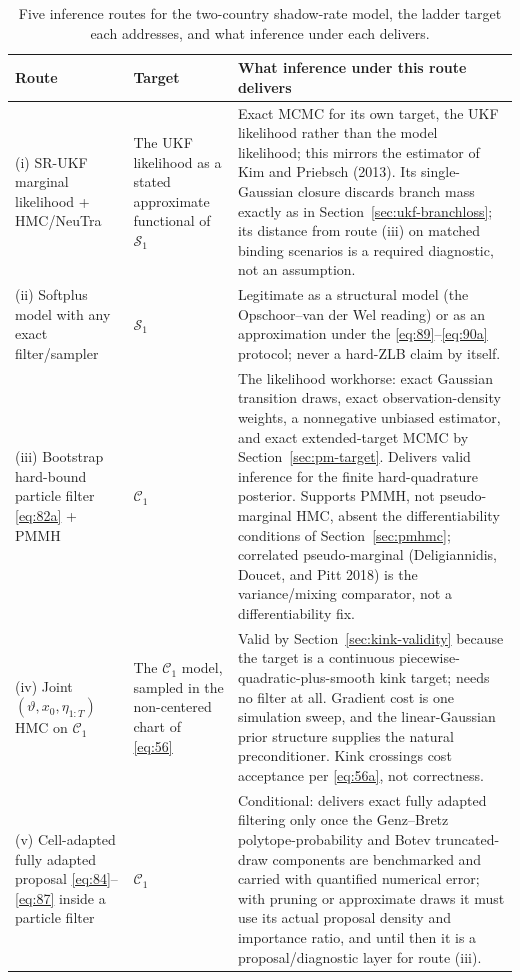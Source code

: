 \documentclass[11pt]{article}
\begin{document}
\begin{table}[htbp]\small
\begin{tabularx}{\textwidth}{@{}>{\raggedright\arraybackslash}p{}XX@{}}
\toprule
Route & Target & What inference under this route delivers \\
\midrule
(i) SR-UKF marginal likelihood + HMC/NeuTra &
The UKF likelihood as a stated approximate functional of
\(\mathcal S_1\) &
Exact MCMC for its own target, the UKF likelihood rather than the model
likelihood; this mirrors the estimator of Kim and Priebsch (2013). Its
single-Gaussian closure discards branch mass exactly as in
Section~\ref{sec:ukf-branchloss}; its distance from route (iii) on matched
binding scenarios is a required diagnostic, not an assumption. \\
(ii) Softplus model with any exact filter/sampler &
\(\mathcal S_1\) &
Legitimate as a structural model (the Opschoor--van der Wel reading)
or as an approximation under the \eqref{eq:89}--\eqref{eq:90a}
protocol; never a hard-ZLB claim by itself. \\
(iii) Bootstrap hard-bound particle filter \eqref{eq:82a} + PMMH &
\(\mathcal C_1\) &
The likelihood workhorse: exact Gaussian transition draws, exact
observation-density weights, a nonnegative unbiased estimator, and
exact extended-target MCMC by Section~\ref{sec:pm-target}. Delivers valid
inference for the finite hard-quadrature posterior. Supports PMMH, not
pseudo-marginal HMC, absent the differentiability conditions of
Section~\ref{sec:pmhmc}; correlated pseudo-marginal (Deligiannidis, Doucet,
and Pitt 2018) is the variance/mixing comparator, not a
differentiability fix. \\
(iv) Joint \((\vartheta,x_0,\eta_{1:T})\) HMC on \(\mathcal C_1\) &
The \(\mathcal C_1\) model, sampled in the non-centered chart of
\eqref{eq:56} &
Valid by Section~\ref{sec:kink-validity} because the target is a continuous
piecewise-quadratic-plus-smooth kink target; needs no filter at all.
Gradient cost is one simulation sweep, and the linear-Gaussian prior
structure supplies the natural preconditioner. Kink crossings cost
acceptance per \eqref{eq:56a}, not correctness. \\
(v) Cell-adapted fully adapted proposal
\eqref{eq:84}--\eqref{eq:87} inside a particle filter &
\(\mathcal C_1\) &
Conditional: delivers exact fully adapted filtering only once the
Genz--Bretz polytope-probability and Botev truncated-draw components
are benchmarked and carried with quantified numerical error; with
pruning or approximate draws it must use its actual proposal density
and importance ratio, and until then it is a proposal/diagnostic layer
for route (iii). \\
\bottomrule
\end{tabularx}
\caption{Five inference routes for the two-country shadow-rate model,
the ladder target each addresses, and what inference under each
delivers.}\label{tab:routes}
\end{table}
\end{document}
